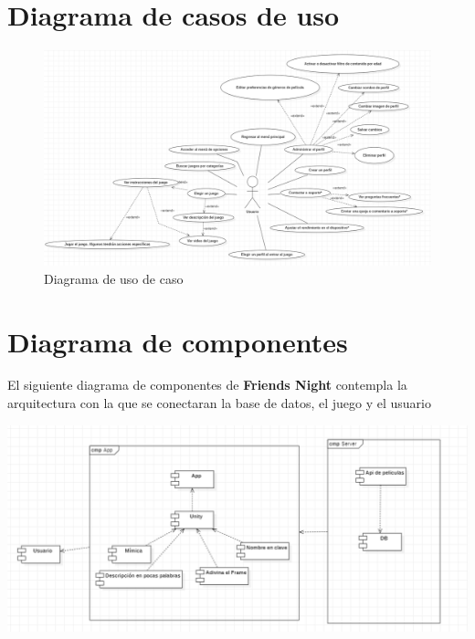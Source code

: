 \documentclass[12pt, oneside, letterpaper]{book}
\begin{document}
\section{Diagrama de casos de uso}
\begin{figure}[h]
    \begin{flushleft}
        \includegraphics[width=1.1\textwidth]{DiagramaUsoDeCasoFN.png}
        \caption{Diagrama de uso de caso}
        \label{Diagrama}
    \end{flushleft}
\end{figure}


\vspace{1cm}

\section{Diagrama de componentes}
\fontsize{14}{18}\selectfont
\par 
El siguiente diagrama de componentes de \textbf{Friends Night} contempla la arquitectura con la que se conectaran la base de datos, el juego y el usuario

\begin{center}
	\centering
		\includegraphics[width=1.2\textwidth]{DiagramaDeComponentesFriendsNight.png}

	\caption{Diagrama de componentes}
	\label{DiagramaComponentes}
\end{center}
\vspace{1cm}
\end{document}

